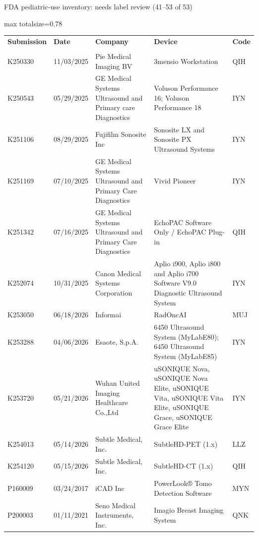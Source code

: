\documentclass[aspectratio=169]{beamer}
\renewcommand{\arraystretch}{1.08}
\begin{document}
\begin{frame}[category=FDA appendix]{FDA pediatric-use inventory: needs label review (41--53 of 53)}
\begin{adjustbox}{max totalsize={\textwidth}{0.78\textheight}}
\renewcommand{\arraystretch}{1.2}
\begin{tabular}{|p{}|p{}|p{}|p{}|p{}|}
\hline \textbf{Submission} & \textbf{Date} & \textbf{Company} & \textbf{Device} & \textbf{Code} \\\\ \hline
K250330 & 11/03/2025 & Pie Medical Imaging BV & 3mensio Workstation & QIH \\ \hline
K250543 & 05/29/2025 & GE Medical Systems Ultrasound and Primary care Diagnostics & Voluson Performance 16; Voluson Performance 18 & IYN \\ \hline
K251106 & 08/29/2025 & Fujifilm Sonosite Inc & Sonosite LX and Sonosite PX Ultrasound Systems & IYN \\ \hline
K251169 & 07/10/2025 & GE Medical Systems Ultrasound and Primary Care Diagnostics & Vivid Pioneer & IYN \\ \hline
K251342 & 07/16/2025 & GE Medical Systems Ultrasound and Primary Care Diagnostics & EchoPAC Software Only / EchoPAC Plug-in & QIH \\ \hline
K252074 & 10/31/2025 & Canon Medical Systems Corporation & Aplio i900, Aplio i800 and Aplio i700 Software V9.0 Diagnostic Ultrasound System & IYN \\ \hline
K253050 & 06/18/2026 & Informai & RadOncAI & MUJ \\ \hline
K253288 & 04/06/2026 & Esaote, S.p.A. & 6450 Ultrasound System (MyLabE80); 6450 Ultrasound System (MyLabE85) & IYN \\ \hline
K253720 & 05/21/2026 & Wuhan United Imaging Healthcare Co.,Ltd & uSONIQUE Nova, uSONIQUE Nova Elite, uSONIQUE Vita, uSONIQUE Vita Elite, uSONIQUE Grace, uSONIQUE Grace Elite & IYN \\ \hline
K254013 & 05/14/2026 & Subtle Medical, Inc. & SubtleHD-PET (1.x) & LLZ \\ \hline
K254120 & 05/15/2026 & Subtle Medical, Inc. & SubtleHD-CT (1.x) & QIH \\ \hline
P160009 & 03/24/2017 & iCAD Inc & PowerLook® Tomo Detection Software & MYN \\ \hline
P200003 & 01/11/2021 & Seno Medical Instruments, Inc. & Imagio Breast Imaging System & QNK \\ \hline
\end{tabular}
\end{adjustbox}
\end{frame}
\end{document}
